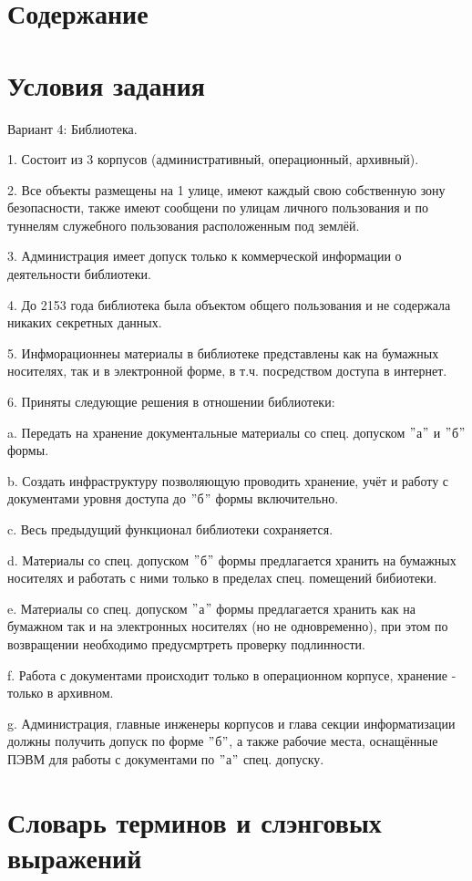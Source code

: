 \documentclass[utf8,14pt,a4paper,oneside,russian]{book}
\makeatletter
\renewcommand{\tableofcontents}{\section*{Содержание}\markboth{Содержание}{}\@starttoc{toc}\newpage}
\makeatother
\begin{document}
\tableofcontents

\section{Условия задания}

Вариант 4: Библиотека.

1. Состоит из 3 корпусов (административный, операционный, архивный).

2. Все объекты размещены на 1 улице, имеют каждый свою собственную зону безопасности, также имеют сообщени по улицам личного пользования
и по туннелям служебного пользования расположенным под землёй.

3. Администрация имеет допуск только к коммерческой информации о деятельности библиотеки.

4. До 2153 года библиотека была объектом общего пользования и не содержала никаких секретных данных.

5. Инфморационнеы материалы в библиотеке представлены как на бумажных носителях, так и в электронной форме, в т.ч. посредством доступа в интернет.

6. Приняты следующие решения в отношении библиотеки:

a. Передать на хранение документальные материалы со спец. допуском
$"$а$"$ и $"$б$"$ формы.

b. Создать инфраструктуру позволяющую проводить хранение, учёт и работу с документами уровня доступа до $"$б$"$ формы включительно.

c. Весь предыдущий функционал библиотеки сохраняется.

d. Материалы со спец. допуском $"$б$"$ формы предлагается хранить на бумажных носителях и работать с ними только в пределах спец.
помещений бибиотеки.

e. Материалы со спец. допуском $"$а$"$ формы предлагается хранить как на бумажном так и на электронных носителях (но не одновременно), при
этом по возвращении необходимо предусмртреть проверку подлинности.

f. Работа с документами происходит только в операционном корпусе, хранение - только в архивном.

g. Администрация, главные инженеры корпусов и глава секции информатизации должны получить допуск по форме $"$б$"$, а также рабочие места,
оснащённые ПЭВМ для работы с документами по $"$а$"$  спец. допуску.

\newpage
\section{Словарь терминов и слэнговых выражений}
\end{document}
